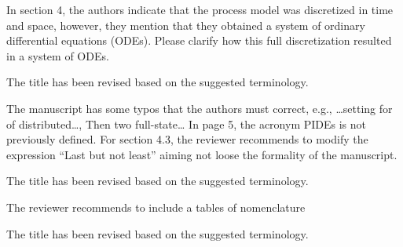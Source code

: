 \documentclass[10pt,answers]{exam}
\begin{document}
\begin{questions}
    \question In section 4, the authors indicate that the process model was discretized in time and space, however, they mention that they obtained a system of ordinary differential equations (ODEs). Please clarify how this full discretization resulted in a system of ODEs.

    \begin{solutionorbox}
        The title has been revised based on the suggested terminology.
    \end{solutionorbox}


    \question The manuscript has some typos that the authors must correct, e.g., …setting for of distributed…, Then two full-state… In page 5, the acronym PIDEs is not previously defined. For section 4.3, the reviewer recommends to modify the expression “Last but not least” aiming not loose the formality of the manuscript.

    \begin{solutionorbox}
        The title has been revised based on the suggested terminology.
    \end{solutionorbox}


    \question The reviewer recommends to include a tables of nomenclature

    \begin{solutionorbox}
        The title has been revised based on the suggested terminology.
    \end{solutionorbox}
\end{questions}


\newpage


\end{document}

